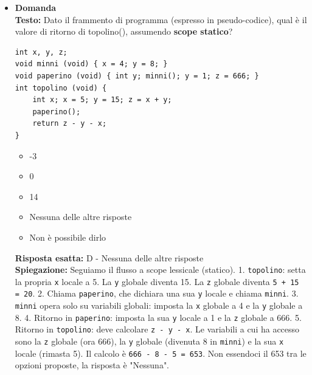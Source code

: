\documentclass[12pt, a4paper]{article}
\newcounter{domandateoria}
\begin{document}
\begin{itemize}
    \item {}\textbf{Domanda \thedomandateoria} \\
    \textbf{Testo:} Dato il frammento di programma (espresso in pseudo-codice), qual è il valore di ritorno di topolino(), assumendo \textbf{scope statico}?
\begin{verbatim}
int x, y, z;
void minni (void) { x = 4; y = 8; }
void paperino (void) { int y; minni(); y = 1; z = 666; }
int topolino (void) {
    int x; x = 5; y = 15; z = x + y;
    paperino();
    return z - y - x;
}
\end{verbatim}
    \begin{itemize}
        \item[A)] -3
        \item[B)] 0
        \item[C)] 14
        \item[D)] Nessuna delle altre risposte
        \item[E)] Non è possibile dirlo
    \end{itemize}
    \textbf{Risposta esatta:} D - Nessuna delle altre risposte \\
    \textbf{Spiegazione:} Seguiamo il flusso a scope lessicale (statico). 
    1. \texttt{topolino}: setta la propria \texttt{x} locale a 5. La \texttt{y} globale diventa 15. La \texttt{z} globale diventa \texttt{5 + 15 = 20}.
    2. Chiama \texttt{paperino}, che dichiara una sua \texttt{y} locale e chiama \texttt{minni}.
    3. \texttt{minni} opera solo su variabili globali: imposta la \texttt{x} globale a 4 e la \texttt{y} globale a 8.
    4. Ritorno in \texttt{paperino}: imposta la sua \texttt{y} locale a 1 e la \texttt{z} globale a 666.
    5. Ritorno in \texttt{topolino}: deve calcolare \texttt{z - y - x}. Le variabili a cui ha accesso sono la \texttt{z} globale (ora 666), la \texttt{y} globale (divenuta 8 in \texttt{minni}) e la sua \texttt{x} locale (rimasta 5). Il calcolo è \texttt{666 - 8 - 5 = 653}.
    Non essendoci il 653 tra le opzioni proposte, la risposta è "Nessuna".
    \vspace{0.3cm}

\newpage


\end{itemize}
\end{document}
